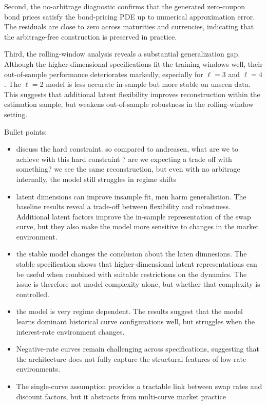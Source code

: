 Second, the no-arbitrage diagnostic confirms that the generated zero-coupon bond prices satisfy the bond-pricing PDE up to numerical approximation error. The residuals are close to zero across maturities and currencies, indicating that the arbitrage-free construction is preserved in practice.

Third, the rolling-window analysis reveals a substantial generalization gap. Although the higher-dimensional specifications fit the training windows well, their out-of-sample performance deteriorates markedly, especially for $\ell=3$ and $\ell=4$. The $\ell=2$ model is less accurate in-sample but more stable on unseen data. This suggests that additional latent flexibility improves reconstruction within the estimation sample, but weakens out-of-sample robustness in the rolling-window setting.


Bullet points:

\begin{itemize}
    \item discuss the hard constraint. so compared to andreasen, what are we to achieve with this hard constraint ? are we expecting a trade off with something? we see the same reconstruction, but even with no arbitrage internally, the model still struggles in regime shifts 
    \item latent dimensions can improve insample fit, men harm generalistion. The baseline results reveal a trade-off between flexibility and robustness. Additional latent factors improve the in-sample representation of the swap curve, but they also make the model more sensitive to changes in the market environment.
    \item the stable model changes the conclusion about the laten dimnesions. The stable specification shows that higher-dimensional latent representations can be useful when combined with suitable restrictions on the dynamics. The issue is therefore not model complexity alone, but whether that complexity is controlled.
    \item the model is very regime dependent. The results suggest that the model learns dominant historical curve configurations well, but struggles when the interest-rate environment changes.
    \item Negative-rate curves remain challenging across specifications, suggesting that the architecture does not fully capture the structural features of low-rate environments.
    \item The single-curve assumption provides a tractable link between swap rates and discount factors, but it abstracts from multi-curve market practice
\end{itemize}

